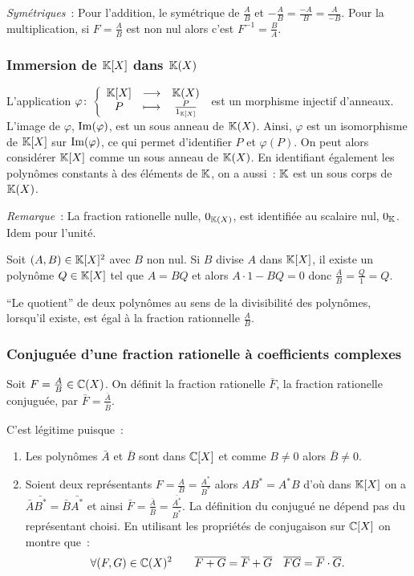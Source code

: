 \emph{Symétriques}~: Pour l'addition, le symétrique de \(\frac{A}{B}\) et \(-\frac{A}{B}=\frac{-A}{B}=\frac{A}{-B}\). Pour la multiplication, si \(F=\frac{A}{B}\) est non nul alors c'est \(F^{-1}=\frac{B}{A}\).

\subsubsection{Immersion de \(\mathbb{K}[X]\) dans \(\mathbb{K}(X)\)} 
L'application \(\varphi\colon \left\{\begin{array}{ccc} \mathbb{K}[X] & \longrightarrow &\mathbb{K}(X)\\ P & \longmapsto & \frac{P}{1_{\mathbb{K}[X]}} \end{array} \right.\) est un morphisme injectif d'anneaux. L'image de \(\varphi\), \(\operatorname{Im}(\varphi)\), est un sous anneau de \(\mathbb{K}(X)\). Ainsi, \(\varphi\) est un isomorphisme de \(\mathbb{K}[X]\) sur \(\operatorname{Im}(\varphi)\), ce qui permet d'identifier \(P\) et \(\varphi(P)\). On peut alors considérer \(\mathbb{K}[X]\) comme un sous anneau de \(\mathbb{K}(X)\). En identifiant également les polynômes constants à des éléments de \(\mathbb{K}\), on a aussi~: \(\mathbb{K}\) est un sous corps de \(\mathbb{K}(X)\).

\emph{Remarque}~: La fraction rationelle nulle, \(0_{\mathbb{K}(X)}\), est identifiée au scalaire nul, \(0_{\mathbb{K}}\). Idem pour l'unité.

Soit \((A,B) \in \mathbb{K}[X]^2\) avec \(B\) non nul. Si \(B\) divise \(A\) dans \(\mathbb{K}[X]\), il existe un polynôme \(Q \in \mathbb{K}[X]\) tel que \(A=BQ\) et alors \(A\cdot 1-BQ=0\) donc \(\frac{A}{B}=\frac{Q}{1}=Q\).

``Le quotient'' de deux polynômes au sens de la divisibilité des polynômes, lorsqu'il existe, est égal à la fraction rationnelle \(\frac{A}{B}\).

\subsubsection{Conjuguée d'une fraction rationelle à coefficients complexes}

\begin{defdef}
  Soit \(F=\frac{A}{B} \in \mathbb{C}(X)\). On définit la fraction rationelle \(\bar{F}\), la fraction rationelle conjuguée, par \(\bar{F}=\frac{\bar{A}}{\bar{B}}\).
\end{defdef}

C'est légitime puisque~:
\begin{enumerate}
\item Les polynômes \(\bar{A}\) et \(\bar{B}\) sont dans \(\mathbb{C}[X]\) et comme \(B \neq 0\) alors \(\bar{B} \neq 0\).
\item Soient deux représentants \(F=\frac{A}{B}=\frac{A^*}{B^*}\) alors \(AB^*=A^*B\) d'où dans \(\mathbb{K}[X]\) on a \(\bar{A}\bar{B^*}=\bar{B}\bar{A^*}\) et ainsi \(\bar{F}=\frac{\bar{A}}{\bar{B}}=\frac{\bar{A^*}}{\bar{B^*}}\). La définition du conjugué ne dépend pas du représentant choisi. En utilisant les propriétés de conjugaison sur \(\mathbb{C}[X]\) on montre que~:
  \begin{equation}
    \forall (F,G) \in \mathbb{C}(X)^2 \qquad \overline{F+G}=\overline{F}+\overline{G} \quad \overline{FG}=\overline{F} \cdot \overline{G}.
  \end{equation}
\end{enumerate}

